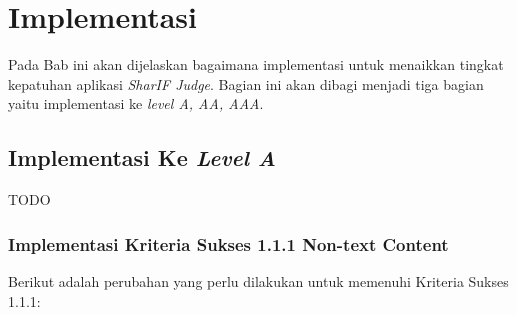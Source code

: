 \chapter{Implementasi}
\label{chap:implementasi}

Pada Bab ini akan dijelaskan bagaimana implementasi untuk menaikkan tingkat kepatuhan aplikasi \textit{SharIF Judge}. Bagian ini akan dibagi menjadi tiga bagian yaitu implementasi ke \textit{level A, AA, AAA}.

\section{Implementasi Ke \textit{Level A}}
\label{sec:implementasi_A}
TODO

\subsection{Implementasi Kriteria Sukses 1.1.1 Non-text Content}
\label{subsec:implementasi_A_1.1.1}

Berikut adalah perubahan yang perlu dilakukan untuk memenuhi Kriteria Sukses 1.1.1:

